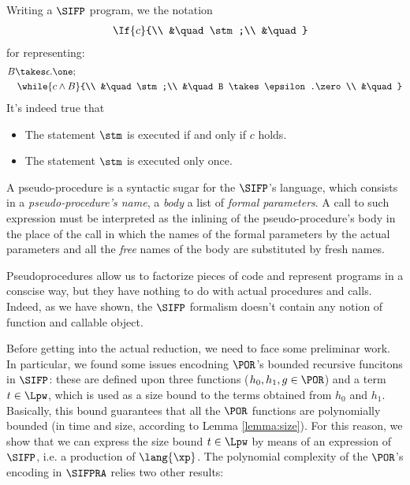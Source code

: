 \begin{notation}
\label{remark:if}
Writing a $\SIFP$ program, we the notation
\begin{align*}
&\quad\If {c} {\\
&\quad\stm;\\
&\quad}\\
\end{align*}
for representing:
\begin{align*}
&B \takes \epsilon.\one; \\
&\quad\while {c \land B} {\\
&\quad\stm;\\
&\quad B \takes \epsilon.\zero\\
&\quad}\\
\end{align*}
It's indeed true that
\begin{itemize}
\item The statement $\stm$ is executed if and only if $c$ holds.
\item The statement $\stm$ is executed only once.
\end{itemize}
\end{notation}

\begin{notation}
A pseudo-procedure is a syntactic sugar for the $\SIFP$'s language, which consists in a \emph{pseudo-procedure's name}, a \emph{body} a list of \emph{formal parameters}. A call to such expression must be interpreted as the inlining of the pseudo-procedure's body in the place of the call in which the names of the formal parameters by the actual parameters and all the \emph{free} names of the body are substituted by fresh names.
\end{notation}

Pseudoprocedures allow us to factorize pieces of code and represent
programs in a conscise way, but they have nothing to do with actual
procedures and calls.
Indeed, as we have shown, the $\SIFP$ formalism doesn't contain
any notion of function and callable object.

Before getting into the actual reduction, we need to face some preliminar
work.
%
In particular, we found some issues encodning $\POR$'s
bounded recursive funcitons in $\SIFP$:
these are defined upon three functions ($h_0, h_1, g \in \POR$) and
a term $t \in \Lpw$, which is used as a size bound to the terms obtained
from $h_0$ and $h_1$.
Basically, this bound guarantees that all the $\POR$
functions are polynomially bounded (in time and size,
according to Lemma \ref{lemma:size}).
For this reason,
we show that we can express the size bound $t \in \Lpw$
by means of an expression
of $\SIFP$, i.e. a production of $\lang{\xp}$.
%
The polynomial complexity of the $\POR$'s encoding in
$\SIFPRA$ relies two other results:

